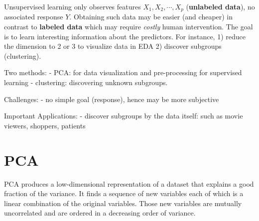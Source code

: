 \documentclass[
  letterpaper,
  DIV=11,
  numbers=noendperiod]{scrreprt}
\begin{document}
Unsupervised learning only observes features \(X_1, X_2, \cdots, X_p\)
(\textbf{unlabeled data}), no associated response \(Y\). Obtaining such
data may be easier (and cheaper) in contrast to \textbf{labeled data}
which may require \emph{costly} human intervention. The goal is to learn
interesting information about the predictors. For instance, 1) reduce
the dimension to 2 or 3 to visualize data in EDA 2) discover subgroups
(clustering).

Two methods: - PCA: for data visualization and pre-processing for
supervised learning - clustering: discovering unknown subgroups.

Challenges: - no simple goal (response), hence may be more subjective

Important Applications: - discover subgroups by the data itself: such as
movie viewers, shoppers, patients

\section{PCA}\label{pca}

PCA produces a low-dimensional representation of a dataset that explains
a good fraction of the variance. It finds a sequence of new variables
each of which is a linear combination of the original variables. Those
new variables are mutually uncorrelated and are ordered in a decreasing
order of variance.
\end{document}
